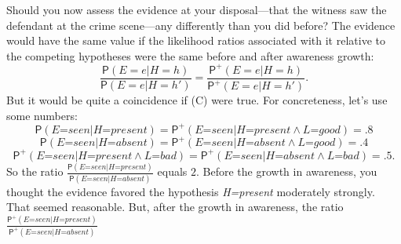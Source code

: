 \documentclass[
  11pt,
  dvipsnames,enabledeprecatedfontcommands]{scrartcl}
\newcommand{\pr}[1]{\ensuremath{\mathsf{P}(#1)}}
\newcommand{\ppr}[2]{\ensuremath{\mathsf{P}^{#1}(#2)}}
\begin{document}
Should you now assess the evidence at your disposal---that the witness
saw the defendant at the crime scene---any differently than you did
before? The evidence would have the same value if the likelihood ratios
associated with it relative to the competing hypotheses were the same
before and after awareness growth:
\[\frac{\pr{E=e \vert H=h}}{\pr{E=e \vert H=h'}}= \frac{\ppr{+}{E=e \vert H=h}}{\ppr{+}{E=e \vert H=h'}} \tag{C}.\]
But it would be quite a coincidence if (C) were true. For concreteness,
let's use some numbers:
\[\pr{\textit{E=seen} \vert \textit{H=present}}=\ppr{+}{\textit{E=seen} \vert \textit{H=present} \wedge \textit{L=good}}=.8\]
\[\pr{\textit{E=seen} \vert \textit{H=absent}}=\ppr{+}{\textit{E=seen} \vert \textit{H=absent} \wedge \textit{L=good}}=.4\]
\[\ppr{+}{\textit{E=seen} \vert \textit{H=present} \wedge \textit{L=bad}} = \ppr{+}{\textit{E=seen} \vert \textit{H=absent} \wedge \textit{L=bad}}=.5.\]
So the ratio
\(\frac{\pr{\textit{E=seen} \vert \textit{H=present}}}{\pr{\textit{E=seen} \vert \textit{H=absent}}}\)
equals \(2\). Before the growth in awareness, you thought the evidence
favored the hypothesis \textit{H=present} moderately strongly. That
seemed reasonable. But, after the growth in awareness, the ratio
\(\frac{\ppr{+}{\textit{E=seen} \vert \textit{H=present}}}{\ppr{+}{\textit{E=seen} \vert \textit{H=absent}}}\)
\end{document}
